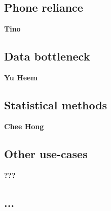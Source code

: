 \documentclass{article}
\begin{document}
\subsection{Phone reliance}

\textbf{Tino}

\subsection{Data bottleneck}

\textbf{Yu Heem}

\subsection{Statistical methods}

\textbf{Chee Hong}

\subsection{Other use-cases}

\textbf{???}

\subsection{...}
\end{document}
